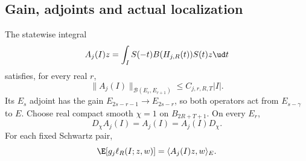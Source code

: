 \subsection{Gain, adjoints and actual localization}

\begin{lemma}\label{L:driver-gain-localization}
  The statewise integral
  \begin{equation}\label{E:driver-coefficient-operator}
    A_j(I)z=\int_I S(-t)B(H_{j,R}(t))S(t)z\ud t
  \end{equation}
  satisfies, for every real $r$,
  \begin{equation}\label{E:driver-gain-one}
    \|A_j(I)\|_{\mathcal B(E_r,E_{r+1})}
    \le C_{j,r,R,T}|I|.
  \end{equation}
  Its $E_s$ adjoint has the gain
  $E_{2s-r-1}\to E_{2s-r}$, so both operators act from $E_{s-\gamma}$
  to $E$. Choose real compact smooth $\chi=1$ on $B_{2R+T+1}$.
  On every $E_r$,
  \begin{equation}\label{E:driver-actual-localization}
    D_\chi A_j(I)=A_j(I)=A_j(I)D_\chi.
  \end{equation}
  For each fixed Schwartz pair,
  \begin{equation}\label{E:driver-covariance-row}
    \E[g_j\ell_R(I;z,w)]=\langle A_j(I)z,w\rangle_E.
  \end{equation}
\end{lemma}

